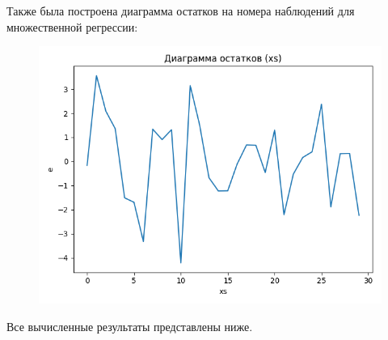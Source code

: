 Также была построена диаграмма остатков на номера наблюдений для множественной регрессии:

\begin{figure}[H]
	\begin{minipage}[H]{\linewidth}
		\begin{center}
			\includegraphics[width=\linewidth]{figures/res_plot_xs}
		\end{center}
	\end{minipage}
\end{figure}

Все вычисленные результаты представлены ниже.

